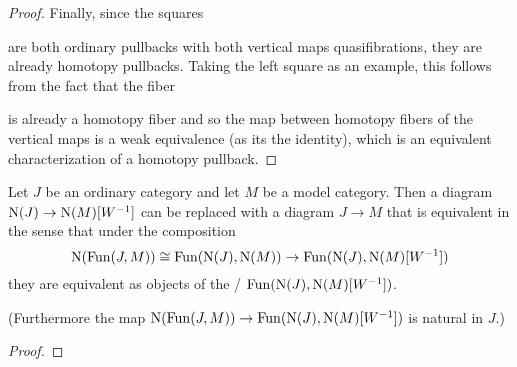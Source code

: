 \begin{prop}
\begin{proof}
        Finally, since the squares 
        \begin{center}
        \end{center}
        are both ordinary pullbacks %
        with both vertical maps quasifibrations, they are already homotopy pullbacks. %
        Taking the left square as an example, this follows from the fact that the fiber
        \begin{center}
        \end{center}
        is already a homotopy fiber and so the map between homotopy fibers of the vertical maps is a weak equivalence (as its the identity), which is an equivalent characterization of a homotopy pullback. %
    \end{proof}
\end{prop}
\begin{lemma}\label{lem:replaceWithStrictDiagram} %
    Let $J$ be an ordinary category and let $M$ be a model category.
    Then a diagram $\operatorname{N}(J)\to\operatorname{N}(M)[W^{-1}]$ can be replaced with a diagram $J\to M$ that is equivalent in the sense that under the composition
    \begin{equation*}
        \operatorname{N}(\operatorname{Fun}(J,M))\cong\operatorname{Fun}(\operatorname{N}(J),\operatorname{N}(M))\to\operatorname{Fun}(\operatorname{N}(J),\operatorname{N}(M)[W^{-1}])
    \end{equation*} 
    they are equivalent as objects of the \inftycat/ $\operatorname{Fun}(\operatorname{N}(J),\operatorname{N}(M)[W^{-1}])$.

    (Furthermore the map $\operatorname{N}(\operatorname{Fun}(J,M))\to\operatorname{Fun}(\operatorname{N}(J),\operatorname{N}(M)[W^{-1}])$ is natural in $J$.)
    \begin{proof}
    \end{proof}
\end{lemma}
